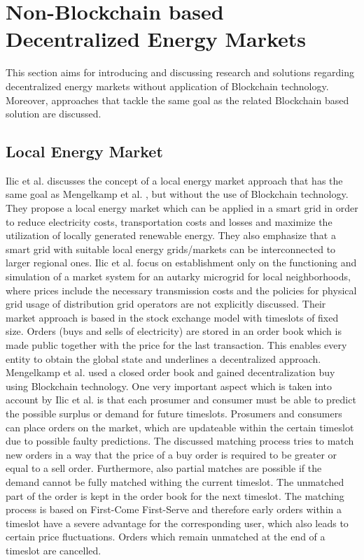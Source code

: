 \documentclass[runningheads]{llncs}
\begin{document}
\section{Non-Blockchain based Decentralized Energy Markets}
This section aims for introducing and discussing research and solutions regarding decentralized energy markets without application of Blockchain technology. Moreover, approaches that tackle the same goal as the related Blockchain based solution are discussed.

\subsection{Local Energy Market}
Ilic et al. \cite{ilic_smart_grid_neighbourhoods} discusses the concept of a local energy market approach that has the same goal as Mengelkamp et al. \cite{mengelkamp_lem}, but without the use of Blockchain technology. They propose a local energy market which can be applied in a smart grid in order to reduce electricity costs, transportation costs and losses and maximize the utilization of locally generated renewable energy. They also emphasize that a smart grid with suitable local energy grids/markets can be interconnected to larger regional ones.\newline
Ilic et al. \cite{ilic_smart_grid_neighbourhoods} focus on establishment only on the functioning and simulation of a market system for an autarky microgrid  for local neighborhoods, where prices include the necessary transmission costs and the policies for physical grid usage of distribution grid operators are not explicitly discussed.  
Their market approach is based in the stock exchange model with timeslots of fixed size. Orders (buys and sells of electricity) are stored in an order book which is made public together with the price for the last transaction. This enables every entity to obtain the global state and underlines a decentralized approach. Mengelkamp et al. \cite{mengelkamp_lem} used a closed order book and gained decentralization buy using Blockchain technology. One very important aspect which is taken into account by Ilic et al. \cite{ilic_smart_grid_neighbourhoods} is that each prosumer and consumer must be able to predict the possible surplus or demand for future timeslots. Prosumers and consumers can place orders on the market, which are updateable within the certain timeslot due to possible faulty predictions. The discussed matching process tries to match new orders in a way that the price of a buy order is required to be greater or equal to a sell order. Furthermore, also partial matches are possible if the demand cannot be fully matched withing the current timeslot. The unmatched part of the order is kept in the order book for the next timeslot. The matching process is based on First-Come First-Serve and therefore early orders within a timeslot have a severe advantage for the corresponding user, which also leads to certain price fluctuations. Orders which remain unmatched at the end of a timeslot are cancelled. \newline
\end{document}
